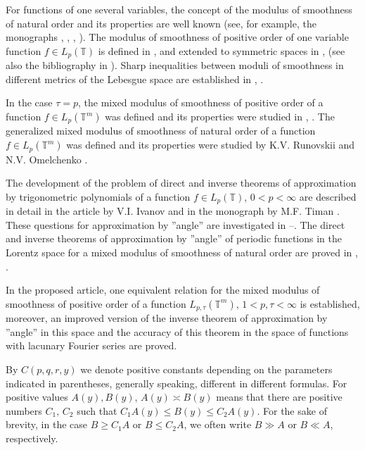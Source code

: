 \documentclass[12pt]{article}
\def\leq {\leqslant}
\def\le {\leqslant}
\def\ge {\geqslant}
\theoremstyle{plain}
\begin{document}
For functions of one several variables, the concept of the modulus of smoothness of natural order and its properties are well known (see, for example, the monographs \cite{13}, \cite[Ch. 1, Sec. 11]{6}, \cite{24}, \cite[p. 97]{25}). The modulus of smoothness of positive order of one variable function $f\in L_{p}(\mathbb{T})$ is defined in \cite{8}, \cite{23} and extended to symmetric spaces in \cite{1}, \cite{26} (see also the bibliography in \cite{21}). Sharp inequalities between moduli of smoothness in different metrics of the Lebesgue space are established in \cite{20}, \cite{11}.

In the case $\tau=p$, the mixed modulus of smoothness of positive order of a function $f\in L_{p}(\mathbb{T}^{m})$ was defined and its properties were studied in \cite{17}, \cite{10}. The generalized mixed modulus of smoothness of natural order of a function $f\in L_{p}(\mathbb{T}^{m})$ was defined and its properties were studied by K.V. Runovskii and N.V. Omelchenko \cite{19}.

The development of the problem of direct and inverse theorems of approximation by trigonometric polynomials of a function $f\in L_{p}(\mathbb{T})$, $0<p<\infty$ are described in detail in the article by V.I. Ivanov \cite{9} and in the monograph by M.F. Timan \cite{25}. These questions for approximation by ''angle'' are investigated in \cite{14}--\cite{17}. The direct and inverse theorems of approximation by ''angle'' of periodic functions in the Lorentz space for a mixed modulus of smoothness of natural order are proved in \cite{2}, \cite{3}.

In the proposed article, one equivalent relation for the mixed modulus of smoothness of positive order of a function $L_{p, \tau}(\mathbb{T}^{m})$, $1<p, \tau<\infty$ is established, moreover, an improved version of the inverse theorem of approximation by ''angle'' in this space and the accuracy of this theorem in the space of functions with lacunary Fourier series are proved.

By $C(p,q,r,y)$ we denote positive constants depending on
the parameters indicated in parentheses, generally speaking, different in different
formulas.
For positive values $A(y), B(y)$, $A(y) \asymp
B(y)$ means that
there are positive numbers $C_{1},\,C_{2}$ such that $C_{1}A(y) \leq B(y) \leq C_{2}A(y)$. For the sake of brevity, in the case $B\ge C_{1}A$ or $B\le C_{2}A$, we often write $B \gg A$ or $B \ll A$, respectively.
  \smallskip

\setcounter{equation}{0}
\setcounter{lemma}{0}
\setcounter{theorem}{0}
\end{document}

